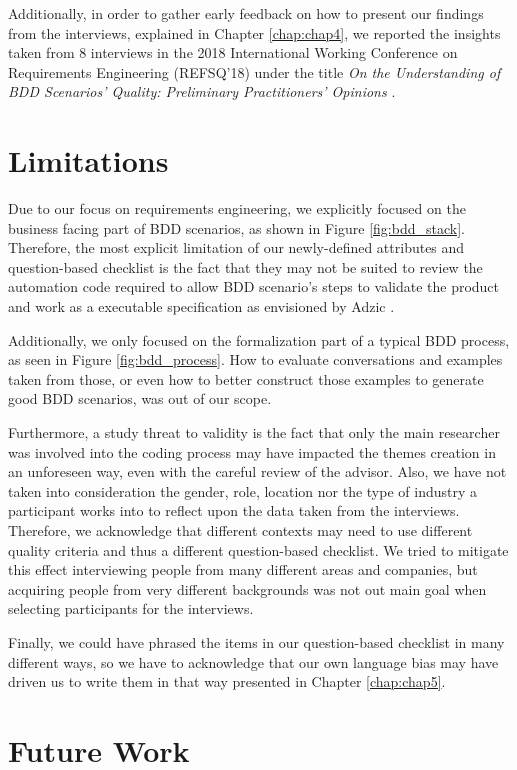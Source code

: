 Additionally, in order to gather early feedback on how to present our findings from the interviews, explained in Chapter \ref{chap:chap4}, we reported the insights taken from 8 interviews in the 2018 International Working Conference on Requirements Engineering (REFSQ'18) under the title \textit{On the Understanding of BDD Scenarios' Quality: Preliminary Practitioners' Opinions} \cite{Refsq_2018}. 

\section{Limitations}

Due to our focus on requirements engineering, we explicitly focused on the business facing part of BDD scenarios, as shown in Figure \ref{fig:bdd_stack}. Therefore, the most explicit limitation of our newly-defined attributes and question-based checklist is the fact that they may not be suited to review the automation code required to allow BDD scenario's steps to validate the product and work as a executable specification as envisioned by Adzic \cite{Adzic_2011}.

Additionally, we only focused on the formalization part of a typical BDD process, as seen in Figure \ref{fig:bdd_process}. How to evaluate conversations and examples taken from those, or even how to better construct those examples to generate good BDD scenarios, was out of our scope.

Furthermore, a study threat to validity is the fact that only the main researcher was involved into the coding process may have impacted the themes creation in an unforeseen way, even with the careful review of the advisor. Also, we have not taken into consideration the gender, role, location nor the type of industry a participant works into to reflect upon the data taken from the interviews. Therefore, we acknowledge that different contexts may need to use different quality criteria and thus a different question-based checklist. We tried to mitigate this effect interviewing people from many different areas and companies, but acquiring people from very different backgrounds was not out main goal when selecting participants for the interviews.

Finally, we could have phrased the items in our question-based checklist in many different ways, so we have to acknowledge that our own language bias may have driven us to write them in that way presented in Chapter \ref{chap:chap5}. 

\section{Future Work}

